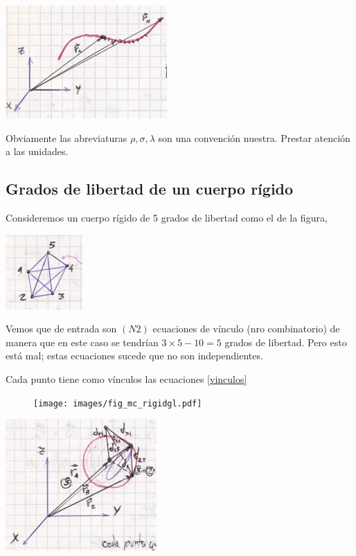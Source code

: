 \documentclass[10pt,oneside]{CBFT_book}
\begin{document}
\includegraphics[scale=0.4]{images/fig_mc_rigid_body_5.jpg}

Obviamente las abreviaturas $\rho, \sigma, \lambda$ son una convención nuestra. Prestar atención a las unidades.

\subsection{Grados de libertad de un cuerpo rígido}

Consideremos un cuerpo rígido de 5 grados de libertad como el de la figura,

\includegraphics[scale=0.4]{images/fig_mc_rigid_body_6.jpg}

Vemos que de entrada son $(N 2)$ ecuaciones de vínculo (nro combinatorio) de manera que en este caso se tendrían
$ 3\times5 - 10 = 5 $ grados de libertad. Pero esto está mal; estas ecuaciones sucede que no son independientes.

Cada punto tiene como vínculos las ecuaciones \eqref{vinculos}

\begin{figure}[htb]
	\begin{center}
	\texttt{[image: images/fig\_mc\_rigidgl.pdf]}	 
	\end{center}
	\caption{}
\end{figure} 

\includegraphics[scale=0.4]{images/fig_mc_rigidgl.jpg}
\end{document}
